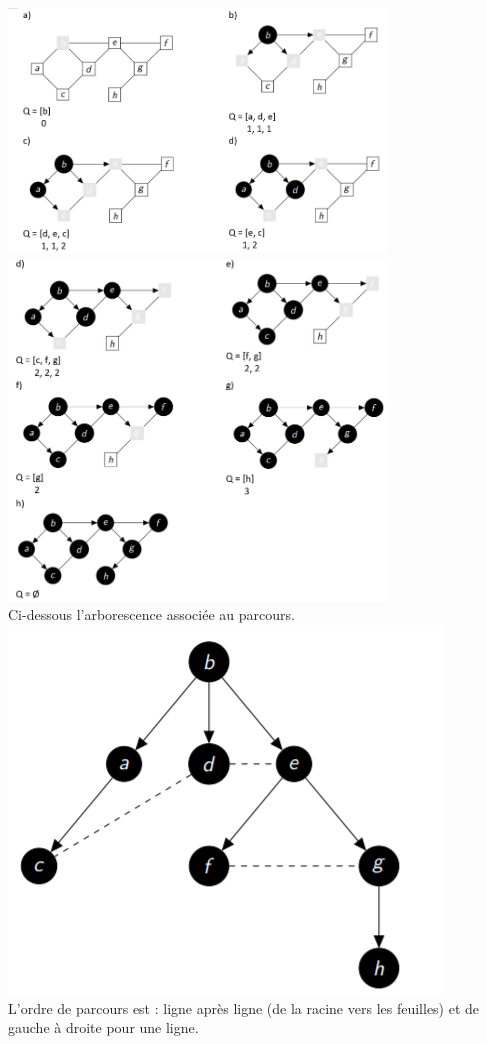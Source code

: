 \begin{Exercice}[5 minutes]
	\begin{solution}
		\includegraphics[width=10cm]{solutions/BFS1.PNG}\\
		\includegraphics[width=10cm]{solutions/BFS2.PNG}\\
 		Ci-dessous l'arborescence associée au parcours.\\
		\includegraphics[]{solutions/BFS3.PNG}\\
		L’ordre de parcours est : ligne après ligne (de la racine vers les feuilles) et
		de gauche à droite pour une ligne.
	\end{solution}
\end{Exercice}

